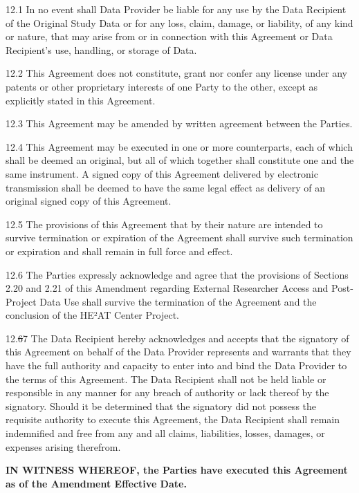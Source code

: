 \documentclass[12pt,letterpaper]{article}
\newcommand{\deleted}[1]{\textcolor{deletecolor}{\sout{#1}}}
\newcommand{\added}[1]{\textcolor{addcolor}{#1}}
\begin{document}
12.1 In no event shall Data Provider be liable for any use by the Data Recipient of the Original Study Data or for any loss, claim, damage, or liability, of any kind or nature, that may arise from or in connection with this Agreement or Data Recipient's use, handling, or storage of Data.

12.2 This Agreement does not constitute, grant nor confer any license under any patents or other proprietary interests of one Party to the other, except as explicitly stated in this Agreement.

12.3 This Agreement may be amended by written agreement between the Parties.

12.4 This Agreement may be executed in one or more counterparts, each of which shall be deemed an original, but all of which together shall constitute one and the same instrument. A signed copy of this Agreement delivered by electronic transmission shall be deemed to have the same legal effect as delivery of an original signed copy of this Agreement.

12.5 The provisions of this Agreement that by their nature are intended to survive termination or expiration of the Agreement shall survive such termination or expiration and shall remain in full force and effect.

\added{12.6 The Parties expressly acknowledge and agree that the provisions of Sections 2.20 and 2.21 of this Amendment regarding External Researcher Access and Post-Project Data Use shall survive the termination of the Agreement and the conclusion of the HE²AT Center Project.}

12.\deleted{6}\added{7} The Data Recipient hereby acknowledges and accepts that the signatory of this Agreement on behalf of the Data Provider represents and warrants that they have the full authority and capacity to enter into and bind the Data Provider to the terms of this Agreement. The Data Recipient shall not be held liable or responsible in any manner for any breach of authority or lack thereof by the signatory. Should it be determined that the signatory did not possess the requisite authority to execute this Agreement, the Data Recipient shall remain indemnified and free from any and all claims, liabilities, losses, damages, or expenses arising therefrom.

\textbf{IN WITNESS WHEREOF, the Parties have executed this Agreement as of the \added{Amendment} Effective Date.}

\vspace{1cm}
\end{document}
